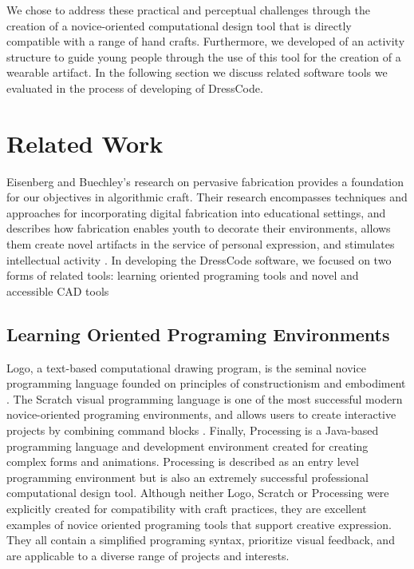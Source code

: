 \documentclass{sigchi}
\begin{document}
We chose to address these practical and perceptual challenges through the creation of a novice-oriented computational design tool that is directly compatible with a range of hand crafts. Furthermore, we developed of an activity structure to guide young people through the use of this tool for the creation of a wearable artifact. In the following section we discuss related software tools we evaluated in the process of developing of DressCode.

\section{Related Work}
Eisenberg and Buechley's research on pervasive fabrication provides a foundation for our objectives in algorithmic craft. Their research encompasses techniques and approaches for incorporating digital fabrication into educational settings, and describes how fabrication enables youth to decorate their environments, allows them create novel artifacts in the service of personal expression, and stimulates intellectual activity \cite{pervasive_fab}. %
In developing the DressCode software, we focused on two forms of related tools: learning oriented programing tools and novel and accessible CAD tools
\subsection{Learning Oriented Programing Environments}
Logo, a text-based computational drawing program, is the seminal novice programming language founded on principles of constructionism and embodiment \cite{papert}. The Scratch visual programming language is one of the most successful modern novice-oriented programing environments, and allows users to create interactive projects by combining command blocks \cite{resnick2}. Finally, Processing is a Java-based programming language and development environment created for creating complex forms and animations. Processing is described as an entry level programming environment but is also an extremely successful professional computational design tool\cite{processing}. Although neither Logo, Scratch or Processing were explicitly created for compatibility with craft practices, they are excellent examples of  novice oriented programing tools that support creative expression. They all contain a simplified programing syntax, prioritize visual feedback, and are applicable to a diverse range of projects and interests.
\end{document}
